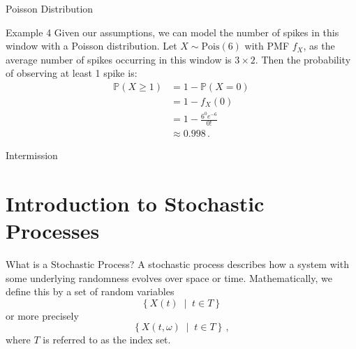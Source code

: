 \documentclass[10pt]{beamer}
\begin{document}
\begin{frame}[fragile]{Poisson Distribution}
\begin{exampleblock}{Example 4}
Given our assumptions, we can model the number of spikes in this window with a Poisson distribution. Let \(X \sim \textrm{Pois}\left(6\right)\) with PMF \(f_X\), as the average number of spikes occurring in this window is \(3\times2\). Then the probability of observing at least 1 spike is:
\begin{equation*}
\begin{aligned}
    \mathbb{P}\left(X \geq 1\right) &= 1 - \mathbb{P}\left(X = 0\right)\\
    &= 1 - f_X\left(0\right)\\
    &= 1 - \frac{6^0e^{-6}}{0!}\\
    &\approx 0.998\,.
\end{aligned}
\end{equation*}
\end{exampleblock}
\end{frame}

\begin{frame}[standout]
Intermission
\end{frame}

\section{Introduction to Stochastic Processes}

\begin{frame}[fragile]{What is a Stochastic Process?}
A stochastic process describes how a system with some underlying randomness evolves over space or time. Mathematically, we define this by a set of random variables
\begin{equation*}
    \left\{X\left(t\right) \;\middle|\; t \in T\right\}
\end{equation*}
or more precisely
\begin{equation*}
    \left\{X\left(t, \omega\right) \;\middle|\; t \in T\right\}\,,
\end{equation*}
where \(T\) is referred to as the index set.\onslide<2->{

Very often, \(T\) is chosen to represent points in time. In discrete-time, we may have \(T = \mathbb{N}\), leading to a countably infinite set of random variables. In continuous-time, usually \(T = \left[0, \infty\right)\), producing an uncountably infinite set of random variables. Whether these random variables are independent or not is determined by the underlying process.}
\end{frame}
\end{document}
